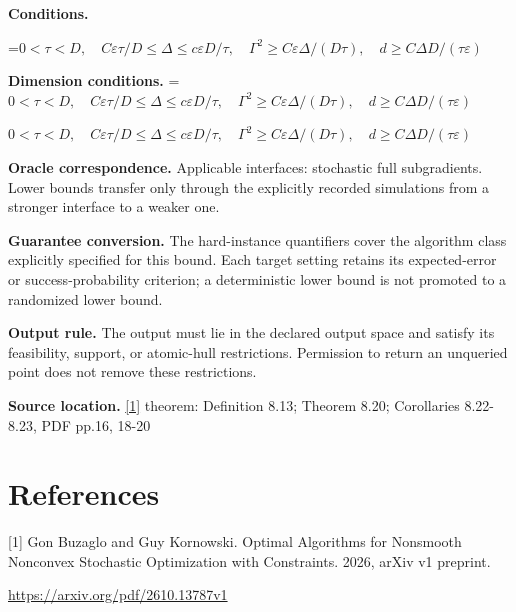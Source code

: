 \documentclass[10pt,a4paper]{article}
\newcommand{\AtlasMath}[1]{\par\begingroup\centering\setbox0=\hbox{$\displaystyle #1$}\ifdim\wd0>1.4\linewidth\typeout{ATLAS WIDE FORMULA: \the\wd0}\fi\ifdim\wd0>\linewidth\resizebox{\linewidth}{!}{\box0}\else\box0\fi\par\endgroup}
\newcommand{\AtlasInlineMath}[1]{\begingroup\setbox0=\hbox{$#1$}\ifdim\wd0>.4\linewidth\endgroup\AtlasMath{#1}\else\endgroup$#1$\fi}
\begin{document}
\textbf{Conditions.} 
\AtlasMath{0<\tau<D,\quad C\varepsilon\tau/D\le\Delta\le c\varepsilon D/\tau,\quad\Gamma^2\ge C\varepsilon\Delta/(D\tau),\quad d\ge C\Delta D/(\tau\varepsilon)}


\textbf{Dimension conditions.} \AtlasInlineMath{0<\tau<D,\quad C\varepsilon\tau/D\le\Delta\le c\varepsilon D/\tau,\quad\Gamma^2\ge C\varepsilon\Delta/(D\tau),\quad d\ge C\Delta D/(\tau\varepsilon)}

\textbf{Oracle correspondence.} Applicable interfaces: stochastic full subgradients. Lower bounds transfer only through the explicitly recorded simulations from a stronger interface to a weaker one.

\textbf{Guarantee conversion.} The hard-instance quantifiers cover the algorithm class explicitly specified for this bound. Each target setting retains its expected-error or success-probability criterion; a deterministic lower bound is not promoted to a randomized lower bound.

\textbf{Output rule.} The output must lie in the declared output space and satisfy its feasibility, support, or atomic-hull restrictions. Permission to return an unqueried point does not remove these restrictions.

\textbf{Source location.} \href{https://arxiv.org/pdf/2610.13787v1}{[1]} theorem: Definition 8.13; Theorem 8.20; Corollaries 8.22-8.23, PDF pp.16, 18-20

\section{References}
[1] Gon Buzaglo and Guy Kornowski. Optimal Algorithms for Nonsmooth Nonconvex Stochastic Optimization with Constraints. 2026, arXiv v1 preprint.

\url{https://arxiv.org/pdf/2610.13787v1}
\end{document}
